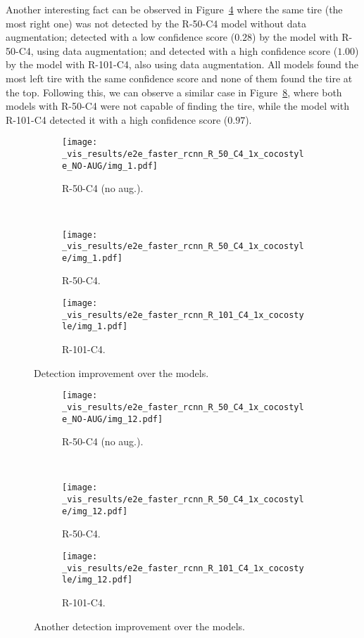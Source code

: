 %
Another interesting fact can be observed in Figure~\ref{fig:improv_1} where the same tire (the most right one) was not detected by the R-50-C4 model without data augmentation; detected with a low confidence score ($0.28$) by the model with R-50-C4, using data augmentation; and detected with a high confidence score ($1.00$) by the model with R-101-C4, also using data augmentation.
All models found the most left tire with the same confidence score and none of them found the tire at the top.
Following this, we can observe a similar case in Figure~\ref{fig:improv_2}, where both models with R-50-C4 were not capable of finding the tire, while the model with R-101-C4 detected it with a high confidence score ($0.97$).
%
\begin{figure}[th!]
  \centering
  \begin{subfigure}[t]{.9\linewidth}
    \centering
    \texttt{[image: \_vis\_results/e2e\_faster\_rcnn\_R\_50\_C4\_1x\_cocostyle\_NO-AUG/img\_1.pdf]}
    \caption{R-50-C4 (no aug.).}
    \label{fig:improv_50N}
  \end{subfigure}\\
  \begin{subfigure}[t]{0.9\linewidth}
    \centering
    \texttt{[image: \_vis\_results/e2e\_faster\_rcnn\_R\_50\_C4\_1x\_cocostyle/img\_1.pdf]}
    \caption{R-50-C4.}
    \label{fig:improv_50}
  \end{subfigure}
  \begin{subfigure}[t]{0.9\linewidth}
    \centering
    \texttt{[image: \_vis\_results/e2e\_faster\_rcnn\_R\_101\_C4\_1x\_cocostyle/img\_1.pdf]}
    \caption{R-101-C4.}
    \label{fig:improv_101}
  \end{subfigure}
  \caption{Detection improvement over the models.}
  \label{fig:improv_1}
\end{figure}
%
%
\begin{figure}[th!]
  \centering
  \begin{subfigure}[t]{.9\linewidth}
    \centering
    \texttt{[image: \_vis\_results/e2e\_faster\_rcnn\_R\_50\_C4\_1x\_cocostyle\_NO-AUG/img\_12.pdf]}
    \caption{R-50-C4 (no aug.).}
    \label{fig:improv_50N}
  \end{subfigure}\\
  \begin{subfigure}[t]{0.9\linewidth}
    \centering
    \texttt{[image: \_vis\_results/e2e\_faster\_rcnn\_R\_50\_C4\_1x\_cocostyle/img\_12.pdf]}
    \caption{R-50-C4.}
    \label{fig:improv_50}
  \end{subfigure}
  \begin{subfigure}[t]{0.9\linewidth}
    \centering
    \texttt{[image: \_vis\_results/e2e\_faster\_rcnn\_R\_101\_C4\_1x\_cocostyle/img\_12.pdf]}
    \caption{R-101-C4.}
    \label{fig:improv_101}
  \end{subfigure}
  \caption{Another detection improvement over the models.}
  \label{fig:improv_2}
\end{figure}
%

